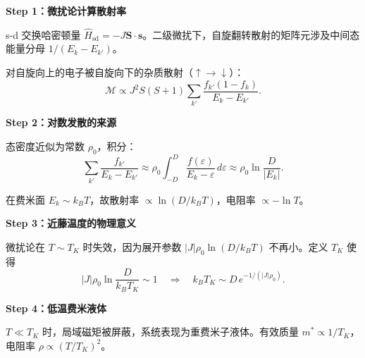 \begin{derivationbox}
\textbf{Step 1：微扰论计算散射率}

s-d 交换哈密顿量 $\hat{H}_{\text{sd}}=-J\mathbf{S}\cdot\mathbf{s}$。二级微扰下，自旋翻转散射的矩阵元涉及中间态能量分母 $1/(E_k-E_{k'})$。

对自旋向上的电子被自旋向下的杂质散射（$\uparrow\to\downarrow$）：
\[
\mathcal{M}\propto J^2S(S+1)\sum_{k'}\frac{f_{k'}(1-f_k)}{E_k-E_{k'}}.
\]

\textbf{Step 2：对数发散的来源}

态密度近似为常数 $\rho_0$，积分：
\[
\sum_{k'}\frac{f_{k'}}{E_k-E_{k'}}\approx\rho_0\int_{-D}^{D}\frac{f(\varepsilon)}{E_k-\varepsilon}\,d\varepsilon
\approx\rho_0\ln\frac{D}{|E_k|}.
\]

在费米面 $E_k\sim k_BT$，故散射率 $\propto\ln(D/k_BT)$，电阻率 $\propto-\ln T$。

\textbf{Step 3：近藤温度的物理意义}

微扰论在 $T\sim T_K$ 时失效，因为展开参数 $|J|\rho_0\ln(D/k_BT)$ 不再小。定义 $T_K$ 使得
\[
|J|\rho_0\ln\frac{D}{k_BT_K}\sim1\quad\Rightarrow\quad k_BT_K\sim D\,e^{-1/(|J|\rho_0)}.
\]

\textbf{Step 4：低温费米液体}

$T\ll T_K$ 时，局域磁矩被屏蔽，系统表现为重费米子液体。有效质量 $m^*\propto 1/T_K$，电阻率 $\rho\propto(T/T_K)^2$。
\end{derivationbox}

\vspace{1em}
